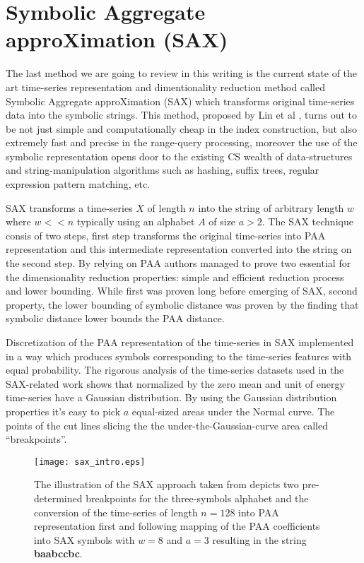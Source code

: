 \section{Symbolic Aggregate approXimation (SAX)}
The last method we are going to review in this writing is the current state of the art time-series representation and dimentionality reduction method called Symbolic Aggregate approXimation (SAX) which transforms original time-series data into the symbolic strings. This method, proposed by Lin et al \cite{citeulike:2821475}, turns out to be not just simple and computationally cheap in the index construction, but also extremely fast and precise in the range-query processing, moreover the use of the symbolic representation opens door to the existing CS wealth of data-structures and string-manipulation algorithms such as hashing, suffix trees, regular expression pattern matching, etc.

SAX transforms a time-series $X$ of length $n$ into the string of arbitrary length $w$ where $w << n$ typically using an alphabet $A$ of size $a >2$. The SAX technique consis of two steps, first step transforms the original time-series into PAA representation and this intermediate representation converted into the string on the second step. By relying on PAA authors managed to prove two essential for the dimensionality reduction properties: simple and efficient reduction process and lower bounding. While first was proven long before emerging of SAX, second property, the lower bounding of symbolic distance was proven by the finding that symbolic distance lower bounds the PAA distance.

Discretization of the PAA representation of the time-series in SAX implemented in a way which produces symbols corresponding to the time-series features with equal probability. The rigorous analysis of the time-series datasets used in the SAX-related work shows that normalized by the zero mean and unit of energy time-series have a Gaussian distribution. By using the Gaussian distribution properties \cite{citeulike:167581} it's easy to pick $a$ equal-sized areas under the Normal curve. The points of the cut lines slicing the the under-the-Gaussian-curve area called ``breakpoints''.
\begin{figure}[tbp]
   \centering
   \texttt{[image: sax\_intro.eps]}
   \caption{The illustration of the SAX approach taken from \cite{citeulike:2821475} depicts two pre-determined breakpoints for the three-symbols alphabet and the conversion of the time-series of length $n=128$ into PAA representation first and following mapping of the PAA coefficients into SAX symbols with $w=8$ and $a=3$ resulting in the string \textbf{baabccbc}.}
   \label{fig:sax_intro}
\end{figure}

